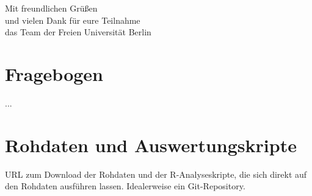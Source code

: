 \documentclass[de]{agse-empir-report}\usepackage[]{graphicx}\usepackage[]{color}
\begin{document}
Mit freundlichen Grüßen\\
und vielen Dank für eure Teilnahme\\ 
das Team der Freien Universität Berlin\\



\section{Fragebogen}

...


\section{Rohdaten und Auswertungskripte}

URL zum Download der Rohdaten und der R-Analyseskripte, die sich direkt auf den
Rohdaten ausführen lassen.
Idealerweise ein Git-Repository.
\end{document}
